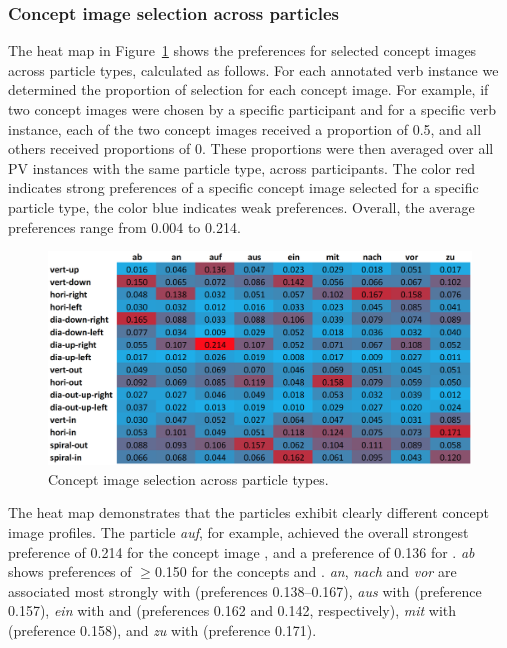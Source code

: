 \documentclass[output=paper]{langsci/langscibook}
\begin{document}
\subsubsection{Concept image selection across particles}

The heat map in Figure~\ref{fig:particle-prop} shows the preferences
for selected concept images across particle types, calculated as
follows. For each annotated verb instance we determined the proportion
of selection for each concept image. For example, if two concept
images were chosen by a specific participant and for a specific verb
instance, each of the two concept images received a proportion of 0.5,
and all others received proportions of 0. These proportions were then
averaged over all PV instances with the same particle type, across
participants. The color red indicates strong preferences of a specific
concept image selected for a specific particle type, the color blue
indicates weak preferences. Overall, the average preferences range
from 0.004 to 0.214.

\begin{figure}[htbp]
  \centering
  \includegraphics[width=\linewidth]{figures/dataset_particles_heat2}
  \caption{Concept image selection across particle types.}
  \label{fig:particle-prop}
\end{figure}

\clearpage
The heat map demonstrates that the particles exhibit clearly different
concept image profiles. The particle \textit{auf}, for example, achieved the
overall strongest preference of 0.214 for the concept image
, and a preference of 0.136 for
. \textit{ab} shows preferences of $\ge$0.150 for the
concepts  and . \textit{an},
\textit{nach} and \textit{vor} are associated most strongly with
 (preferences 0.138--0.167), \textit{aus} with
 (preference 0.157), \textit{ein} with
 and  (preferences 0.162 and
0.142, respectively), \textit{mit} with  (preference
0.158), and \textit{zu} with  (preference 0.171).
\end{document}
